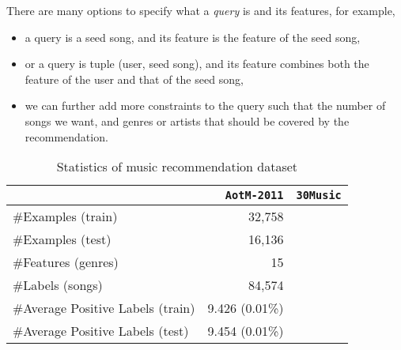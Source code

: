 There are many options to specify what a \emph{query} is and its features, for example,
\begin{itemize}
\item a query is a seed song, and its feature is the feature of the seed song,
\item or a query is tuple (user, seed song), and its feature combines both the feature of the user and that of the seed song,
\item we can further add more constraints to the query such that the number of songs we want, 
      and genres or artists that should be covered by the recommendation.
\end{itemize}



\begin{table}[!h]
\centering
\caption{Statistics of music recommendation dataset}
\label{tab:dataset_music}
\begin{tabular}{l*{2}{r}} \hline \hline
                                  & \texttt{AotM-2011} & \texttt{30Music}  \\ \hline 
\#Examples (train)                & 32,758             & \\
\#Examples (test)                 & 16,136             & \\
\#Features (genres)               & 15                 & \\
\#Labels (songs)                  & 84,574             & \\
\#Average Positive Labels (train) & 9.426 (0.01\%)     & \\
\#Average Positive Labels (test)  & 9.454 (0.01\%)     & \\
\hline
\end{tabular}
\end{table}



